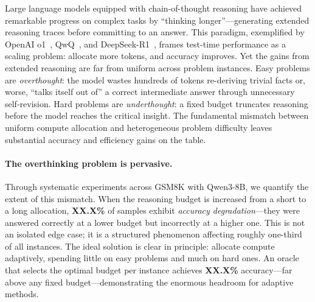 
Large language models equipped with chain-of-thought reasoning have achieved remarkable progress on complex tasks by ``thinking longer''---generating extended reasoning traces before committing to an answer.
This paradigm, exemplified by OpenAI o1~\cite{openai2024o1}, QwQ~\cite{qwq2024}, and DeepSeek-R1~\cite{deepseekr1}, frames test-time performance as a scaling problem: allocate more tokens, and accuracy improves.
Yet the gains from extended reasoning are far from uniform across problem instances.
Easy problems are \emph{overthought}: the model wastes hundreds of tokens re-deriving trivial facts or, worse, ``talks itself out of'' a correct intermediate answer through unnecessary self-revision.
Hard problems are \emph{underthought}: a fixed budget truncates reasoning before the model reaches the critical insight.
The fundamental mismatch between uniform compute allocation and heterogeneous problem difficulty leaves substantial accuracy and efficiency gains on the table.

\paragraph{The overthinking problem is pervasive.}
Through systematic experiments across GSM8K with Qwen3-8B, we quantify the extent of this mismatch.
When the reasoning budget is increased from a short to a long allocation, \textbf{XX.X\%} of samples exhibit \emph{accuracy degradation}---they were answered correctly at a lower budget but incorrectly at a higher one.
This is not an isolated edge case; it is a structured phenomenon affecting roughly one-third of all instances.
The ideal solution is clear in principle: allocate compute adaptively, spending little on easy problems and much on hard ones.
An oracle that selects the optimal budget per instance achieves \textbf{XX.X\%} accuracy---far above any fixed budget---demonstrating the enormous headroom for adaptive methods.

